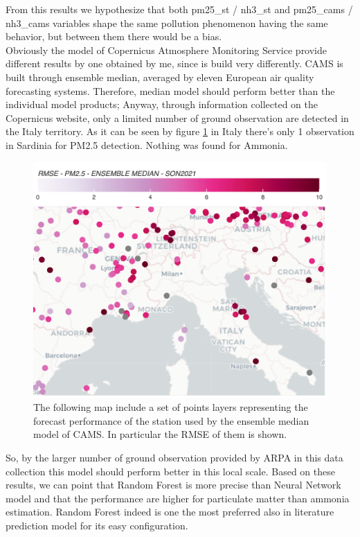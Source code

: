 From this results we hypothesize that both pm25\_st / nh3\_st and pm25\_cams / nh3\_cams variables shape the same pollution phenomenon having the same behavior, but between them there would be a bias.\\
Obviously the model of Copernicus Atmosphere Monitoring Service provide different results by one obtained by me, since is build very differently. CAMS is built through ensemble median, averaged by eleven European air quality forecasting systems. Therefore, median model should perform better than the individual model products\cite{riccio2007seeking}; 
Anyway, through information collected on the Copernicus website, only a limited number of ground observation are detected in the Italy territory. As it can be seen by figure \ref{fig:cams} in Italy there's only 1 observation in Sardinia for PM2.5 detection. Nothing was found for Ammonia.
\begin{figure}[H]
    \centering
    \includegraphics[scale=0.2]{images/cams_obs.png}
    \caption{The following map include a set of points layers representing the forecast performance of the station used by the ensemble median model of CAMS. In particular the RMSE of them is shown\cite{camsobs}. 
}
    \label{fig:cams}
\end{figure}

So, by the larger number of ground observation provided by ARPA in this data collection this model should perform better in this local scale.
\bigbreak
Based on these results, we can point that Random Forest is more precise than Neural Network model and that the performance are higher for particulate matter than ammonia estimation.
Random Forest indeed is one the most preferred also in literature prediction model for its easy configuration.
